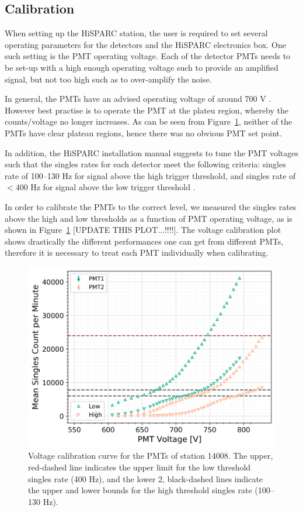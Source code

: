 \subsection{Calibration}

When setting up the HiSPARC station, the user is required to set several operating parameters for the detectors and the HiSPARC electronics box. One such setting is the PMT operating voltage. Each of the detector PMTs needs to be set-up with a high enough operating voltage such to provide an amplified signal, but not too high such as to over-amplify the noise.

In general, the PMTs have an advised operating voltage of around 700 V \citep{fokkema_hisparc_2019}. However best practise is to operate the PMT at the plateu region, whereby the counts/voltage no longer increases. As can be seen from Figure~\ref{fig:PMT_cal}, neither of the PMTs have clear plateau regions, hence there was no obvious PMT set point.

In addition, the HiSPARC installation manual suggests to tune the PMT voltages such that the singles rates for each detector meet the following criteria: singles rate of 100--130 Hz for signal above the high trigger threshold, and singles rate of $<$400 Hz for signal above the low trigger threshold \citep{fokkema_hisparc_2019}.

In order to calibrate the PMTs to the correct level, we measured the singles rates above the high and low thresholds as a function of PMT operating voltage, as is shown in Figure~\ref{fig:PMT_cal} [UPDATE THIS PLOT...!!!!]. The voltage calibration plot shows drastically the different performances one can get from different PMTs, therefore it is necessary to treat each PMT individually when calibrating.

\begin{figure}
	\centering
	\includegraphics[width=0.75\columnwidth]{both_PMTs_post_NIM.png}
	\caption{Voltage calibration curve for the PMTs of station 14008. The upper, red-dashed line indicates the upper limit for the low threshold singles rate (400 Hz), and the lower 2, black-dashed lines indicate the upper and lower bounds for the high threshold singles rate (100--130 Hz).}
	\label{fig:PMT_cal}
\end{figure}


